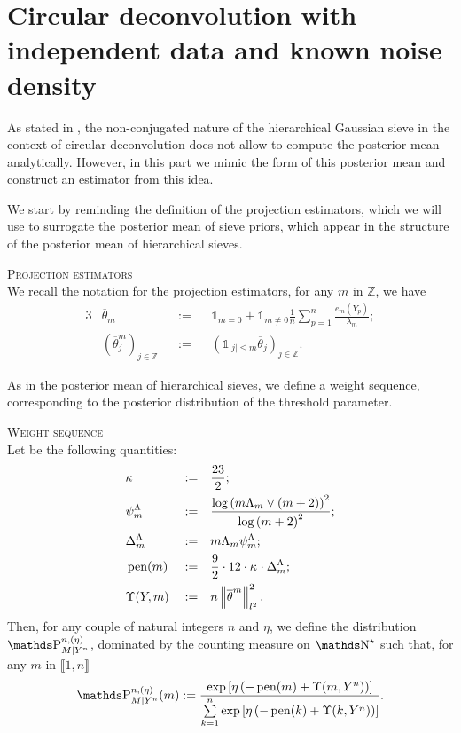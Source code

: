 \section{Circular deconvolution with independent data and known noise density}\label{FREQ_CIRCDECONV_KNOWN_IID}

As stated in , the non-conjugated nature of the hierarchical Gaussian sieve in the context of circular deconvolution does not allow to compute the posterior mean analytically.
However, in this part we mimic the form of this posterior mean and construct an estimator from this idea.

We start by reminding the definition of the projection estimators, which we will use to surrogate the posterior mean of sieve priors, which appear in the structure of the posterior mean of hierarchical sieves.

\begin{rem}{\textsc{Projection estimators} \\}\label{REM_FREQ_CIRCDECONV_KNOWN_IID_PROJEST}
We recall the notation for the projection estimators, for any $m$ in $\mathds{Z}$, we have
\begin{alignat*}{3}
& \overline{\theta}_{m} && := && \mathds{1}_{m = 0} + \mathds{1}_{m \neq 0} \frac{1}{n}\sum\limits_{p = 1}^{n} \frac{e_{m}(Y_{p})}{\lambda_{m}};\\
& \left( \overline{\theta}^{m}_{j} \right)_{j \in \mathds{Z}} && := &&\left(\mathds{1}_{\vert j \vert \leq m} \overline{\theta}_{j}\right)_{j \in \mathds{Z}}.
\end{alignat*}
\end{rem}

As in the posterior mean of hierarchical sieves, we define a weight sequence, corresponding to the posterior distribution of the threshold parameter.

\begin{de}{\textsc{Weight sequence} \\}\label{DE_FREQ_CIRCDECONV_KNOWN_IID_WEIGHT}
Let be the following quantities:
\begin{alignat*}{3}
& \kappa && := && \frac{23}{2};\\
& \cmiSv && := && \frac{\log\left(\Di \iSv[\Di] \vee (\Di + 2)\right)^{2}}{\log\left(\Di + 2\right)^{2}};\\
& \DipenSv && := && \Di \iSv[\Di] \cmiSv; \\
& \pen(\Di) && := && \frac{9}{2} \cdot 12 \cdot \cpen \cdot \DipenSv;\\
& \Upsilon(Y, \Di) && := && n \left\Vert \overline{\theta}^{m} \right\Vert_{l^{2}}^{2}.
\end{alignat*}
Then, for any couple of natural integers $n$ and $\eta$, we define the distribution $\P_{M \vert Y^{n}}^{n, (\eta)}$, dominated by the counting measure on $\N^{\star}$ such that, for any $m$ in $\llbracket 1, n \rrbracket$
\[\P_{M \vert Y^{n}}^{n, (\eta)}(m) := \frac{\exp\left[\eta\left(- \pen(m) + \Upsilon(m, Y^{n})\right)\right]}{\sum\limits_{k = 1}^{n} \exp\left[\eta\left(- \pen(k) + \Upsilon(k, Y^{n})\right)\right]}.\]
\end{de}

